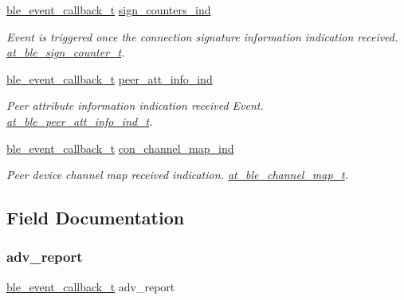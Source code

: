 \begin{DoxyCompactItemize}
\mbox{\hyperlink{ble__manager_8h_a04ce4bb8cb8282f2762e3924b1773cc9}{ble\+\_\+event\+\_\+callback\+\_\+t}} \mbox{\hyperlink{structble__gap__event__cb_a3acdd775f490630b4df601a35256aefa}{sign\+\_\+counters\+\_\+ind}}
\begin{DoxyCompactList}\small\item\em Event is triggered once the connection signature information indication received. \mbox{\hyperlink{structat__ble__sign__counter__t}{at\+\_\+ble\+\_\+sign\+\_\+counter\+\_\+t}}. \end{DoxyCompactList}\item 
\mbox{\hyperlink{ble__manager_8h_a04ce4bb8cb8282f2762e3924b1773cc9}{ble\+\_\+event\+\_\+callback\+\_\+t}} \mbox{\hyperlink{structble__gap__event__cb_a7cae876541e7318f71528229c913ba74}{peer\+\_\+att\+\_\+info\+\_\+ind}}
\begin{DoxyCompactList}\small\item\em Peer attribute information indication received Event. \mbox{\hyperlink{structat__ble__peer__att__info__ind__t}{at\+\_\+ble\+\_\+peer\+\_\+att\+\_\+info\+\_\+ind\+\_\+t}}. \end{DoxyCompactList}\item 
\mbox{\hyperlink{ble__manager_8h_a04ce4bb8cb8282f2762e3924b1773cc9}{ble\+\_\+event\+\_\+callback\+\_\+t}} \mbox{\hyperlink{structble__gap__event__cb_a6b045c39cf5058dc43f1f65e4626b754}{con\+\_\+channel\+\_\+map\+\_\+ind}}
\begin{DoxyCompactList}\small\item\em Peer device channel map received indication. \mbox{\hyperlink{structat__ble__channel__map__t}{at\+\_\+ble\+\_\+channel\+\_\+map\+\_\+t}}. \end{DoxyCompactList}\end{DoxyCompactItemize}


\subsection{Field Documentation}
\mbox{\label{structble__gap__event__cb_a7a194f2870758c8e7d196cd6cf5856be}} 
\subsubsection{\texorpdfstring{adv\_report}{adv\_report}}
{\footnotesize\ttfamily \mbox{\hyperlink{ble__manager_8h_a04ce4bb8cb8282f2762e3924b1773cc9}{ble\+\_\+event\+\_\+callback\+\_\+t}} adv\+\_\+report}



